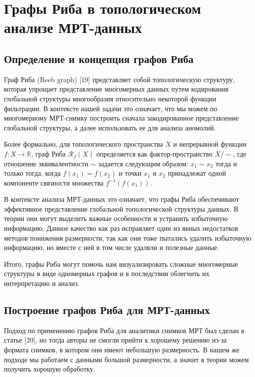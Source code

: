 \documentclass[a4paper,12pt]{extarticle}
\begin{document}
\section{Графы Риба в топологическом анализе МРТ-данных}

\subsection{Определение и концепция графов Риба}

Граф Риба (Reeb graph) [19] представляет собой топологическую структуру, которая упрощает представление многомерных данных путем кодирования глобальной структуры многообразия относительно некоторой функции фильтрации. В контексте нашей задачи это означает, что мы можем по многомерному МРТ-снимку построить сначала закодированное представление глобальной структуры, а далее использовать ее для анализа аномолий. 

Более формально, для топологического пространства $X$ и непрерывной функции $f: X \rightarrow \mathbb{R}$, граф Риба $\mathcal{R}_f(X)$ определяется как фактор-пространство $X/{\sim}$, где отношение эквивалентности $\sim$ задается следующим образом: $x_1 \sim x_2$ тогда и только тогда, когда $f(x_1) = f(x_2)$ и точки $x_1$ и $x_2$ принадлежат одной компоненте связности множества $f^{-1}(f(x_1))$.

В контексте анализа МРТ-данных это означает, что графы Риба обеспечивают эффективное представление глобальной топологической структуры данных. В теории они могут выделить важные особенности и устранить избыточную информацию. Данное качество как раз исправляет один из явных недостатков методов понижения размерности, так как они тоже пытались удалить избыточную информацию, но вместе с ней в том числе удаляли и полезные данные. 

Итого, графы Риба могут помочь нам визуализировать сложные многомерные структуры в виде одномерных графов и в последствии облегчить их интерпретацию и анализ.

\subsection{Построение графов Риба для МРТ-данных}

Подход по применению графов Риба для аналитики снимков МРТ был сделан в статье [20], но тогда авторы не смогли прийти к хорошему решению из-за формата снимков, в котором они имеют небольшую размерность. В нашем же подходе мы работаем с данными большой размерности, а значит в теории можем получить хорошую обработку. 
\end{document}
